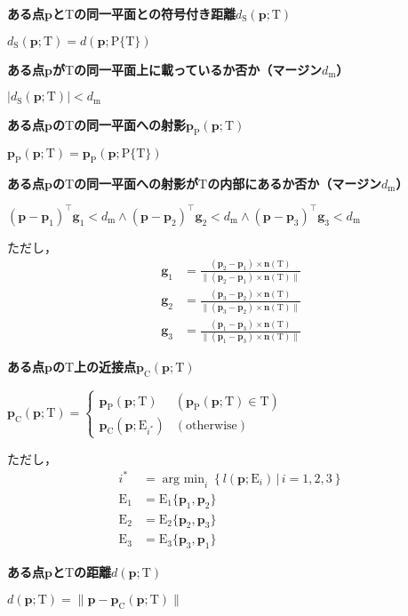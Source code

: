 ﻿\documentclass[a4paper]{jsarticle}
\begin{document}
{\bf ある点$\bm{p}$と$\mathrm{T}$の同一平面との符号付き距離$d_{\mathrm{S}}(\bm{p};\mathrm{T})$}

$d_{\mathrm{S}}(\bm{p};\mathrm{T})=d(\bm{p};\mathrm{P}\{\mathrm{T}\})$

{\bf ある点$\bm{p}$が$\mathrm{T}$の同一平面上に載っているか否か（マージン$d_{\mathrm{m}}$）}

$|d_{\mathrm{S}}(\bm{p};\mathrm{T})|<d_{\mathrm{m}}$

{\bf ある点$\bm{p}$の$\mathrm{T}$の同一平面への射影$\bm{p}_{\mathrm{P}}(\bm{p};\mathrm{T})$}

$\bm{p}_{\mathrm{P}}(\bm{p};\mathrm{T})=\bm{p}_{\mathrm{P}}(\bm{p};\mathrm{P}\{\mathrm{T}\})$

{\bf ある点$\bm{p}$の$\mathrm{T}$の同一平面への射影が$\mathrm{T}$の内部にあるか否か（マージン$d_{\mathrm{m}}$）}

$(\bm{p}-\bm{p}_{1})^{\top}\bm{g}_{1}<d_{\mathrm{m}}\wedge
(\bm{p}-\bm{p}_{2})^{\top}\bm{g}_{2}<d_{\mathrm{m}}\wedge
(\bm{p}-\bm{p}_{3})^{\top}\bm{g}_{3}<d_{\mathrm{m}}$

ただし，
\begin{align*}
\bm{g}_{1}&=\frac{(\bm{p}_{2}-\bm{p}_{1})\times\bm{n}(\mathrm{T})}{\|(\bm{p}_{2}-\bm{p}_{1})\times\bm{n}(\mathrm{T})\|}
\\
\bm{g}_{2}&=\frac{(\bm{p}_{3}-\bm{p}_{2})\times\bm{n}(\mathrm{T})}{\|(\bm{p}_{3}-\bm{p}_{2})\times\bm{n}(\mathrm{T})\|}
\\
\bm{g}_{3}&=\frac{(\bm{p}_{1}-\bm{p}_{3})\times\bm{n}(\mathrm{T})}{\|(\bm{p}_{1}-\bm{p}_{3})\times\bm{n}(\mathrm{T})\|}
\end{align*}

{\bf ある点$\bm{p}$の$\mathrm{T}$上の近接点$\bm{p}_{\mathrm{C}}(\bm{p};\mathrm{T})$}

$\bm{p}_{\mathrm{C}}(\bm{p};\mathrm{T})=\begin{cases}
\bm{p}_{\mathrm{P}}(\bm{p};\mathrm{T}) & (\bm{p}_{\mathrm{P}}(\bm{p};\mathrm{T})\in\mathrm{T}) \\
\bm{p}_{\mathrm{C}}(\bm{p};\mathrm{E}_{i^{*}}) & (\mbox{otherwise})
\end{cases}$

ただし，
\begin{align*}
i^{*}&=\mathop{\mathrm{arg~min}}_{i}\left\{l(\bm{p};\mathrm{E}_{i})\,|\,i=1,2,3\right\}
\\
\mathrm{E}_{1}&=\mathrm{E}_{1}\{\bm{p}_{1},\bm{p}_{2}\}
\\
\mathrm{E}_{2}&=\mathrm{E}_{2}\{\bm{p}_{2},\bm{p}_{3}\}
\\
\mathrm{E}_{3}&=\mathrm{E}_{3}\{\bm{p}_{3},\bm{p}_{1}\}
\end{align*}

{\bf ある点$\bm{p}$と$\mathrm{T}$の距離$d(\bm{p};\mathrm{T})$}

$d(\bm{p};\mathrm{T})=\|\bm{p}-\bm{p}_{\mathrm{C}}(\bm{p};\mathrm{T})\|$
\end{document}
